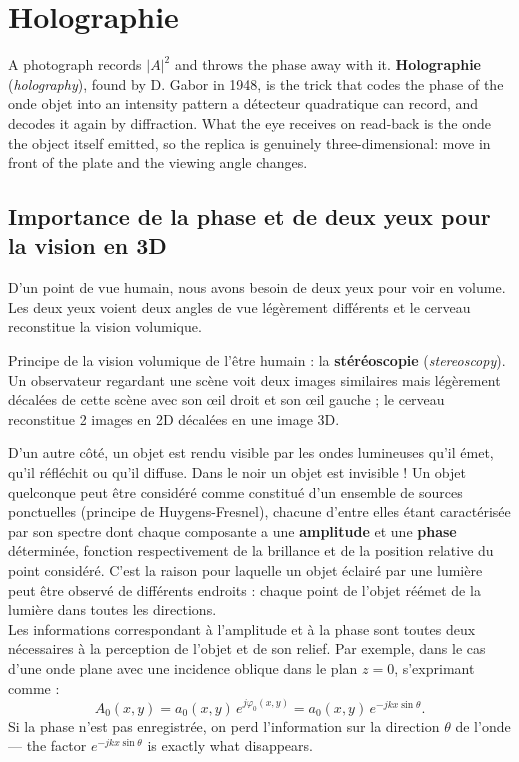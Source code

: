 \section{Holographie}
A photograph records $|A|^2$ and throws the phase away with it.
\textbf{Holographie} (\textit{holography}), found by D. Gabor in 1948, is the
trick that codes the phase of the onde objet into an intensity pattern a
détecteur quadratique can record, and decodes it again by diffraction. What the
eye receives on read-back is the onde the object itself emitted, so the replica
is genuinely three-dimensional: move in front of the plate and the viewing angle
changes.

\subsection{Importance de la phase et de deux yeux pour la vision en 3D}
D'un point de vue humain, nous avons besoin de deux yeux pour voir en volume.
Les deux yeux voient deux angles de vue légèrement différents et le cerveau
reconstitue la vision volumique.

\begin{definition}[Stéréoscopie]
  Principe de la vision volumique de l'être humain : la \textbf{stéréoscopie}
  (\textit{stereoscopy}). Un observateur regardant une scène voit deux images
  similaires mais légèrement décalées de cette scène avec son œil droit et son
  œil gauche ; le cerveau reconstitue 2 images en 2D décalées en une image 3D.
\end{definition}

D'un autre côté, un objet est rendu visible par les ondes lumineuses qu'il émet,
qu'il réfléchit ou qu'il diffuse. Dans le noir un objet est invisible ! Un objet
quelconque peut être considéré comme constitué d'un ensemble de sources
ponctuelles (principe de Huygens-Fresnel), chacune d'entre elles étant
caractérisée par son spectre dont chaque composante a une \textbf{amplitude} et
une \textbf{phase} déterminée, fonction respectivement de la brillance et de la
position relative du point considéré. C'est la raison pour laquelle un objet
éclairé par une lumière peut être observé de différents endroits : chaque point
de l'objet réémet de la lumière dans toutes les directions.\\

Les informations correspondant à l'amplitude et à la phase sont toutes deux
nécessaires à la perception de l'objet et de son relief. Par exemple, dans le
cas d'une onde plane avec une incidence oblique dans le plan $z=0$, s'exprimant
comme :
\[
  A_0(x,y) = a_0(x,y)\,e^{j\varphi_0(x,y)} = a_0(x,y)\,e^{-jkx\sin\theta}.
\]
Si la phase n'est pas enregistrée, on perd l'information sur la direction
$\theta$ de l'onde --- the factor $e^{-jkx\sin\theta}$ is exactly what
disappears.

